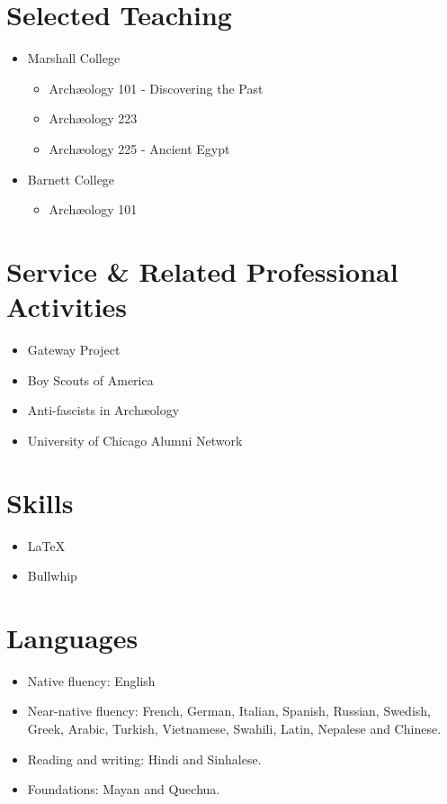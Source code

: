 \documentclass[%
    11pt,
  oneside
  ]{memoir}
\let\oldsection\section
\renewcommand{\section}[1]{%
  \oldsection{#1}
  \leavevmode
  \par
  \vspace{\dimexpr-\baselineskip-\parskip}
}
\begin{document}
\hypertarget{selected-teaching}{%
\section{Selected Teaching}\label{selected-teaching}}

\begin{itemize}
\tightlist
\item
  Marshall College

  \begin{itemize}
  \tightlist
  \item
    Archæology 101 - Discovering the Past
  \item
    Archæology 223
  \item
    Archæology 225 - Ancient Egypt
  \end{itemize}
\item
  Barnett College

  \begin{itemize}
  \tightlist
  \item
    Archæology 101
  \end{itemize}
\end{itemize}

\hypertarget{service-related-professional-activities}{%
\section{Service \& Related Professional
Activities}\label{service-related-professional-activities}}

\begin{itemize}
\tightlist
\item
  Gateway Project
\item
  Boy Scouts of America
\item
  Anti-fascists in Archæology
\item
  University of Chicago Alumni Network
\end{itemize}

\hypertarget{skills}{%
\section{Skills}\label{skills}}

\begin{itemize}
\tightlist
\item
  \LaTeX
\item
  Bullwhip
\end{itemize}

\hypertarget{languages}{%
\section{Languages}\label{languages}}

\begin{itemize}
\tightlist
\item
  Native fluency: English
\item
  Near-native fluency: French, German, Italian, Spanish, Russian,
  Swedish, Greek, Arabic, Turkish, Vietnamese, Swahili, Latin, Nepalese
  and Chinese.
\item
  Reading and writing: Hindi and Sinhalese.
\item
  Foundations: Mayan and Quechua.
\end{itemize}
\end{document}
